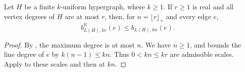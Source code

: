 \begin{lemma}
Let $H$ be a finite $k$-uniform hypergraph, where $k\ge1$.
If $r\ge1$ is real and all vertex degrees of $H$ are at most $r$, then,
for $n=\lfloor r\rfloor_+$ and every edge $e$,
\[
b^{\mathbb R}_{L(H),kr}(e)\le b_{L(H),kn}(e).
\]
\end{lemma}
\begin{proof}
By , the maximum degree is at most $n$.
We have $n\ge1$, and  bounds
the line degree of $e$ by $k(n-1)\le kn$. Thus $0<kn\le kr$ are
admissible scales. Apply  to these
scales and then  at $kn$.
\end{proof}
